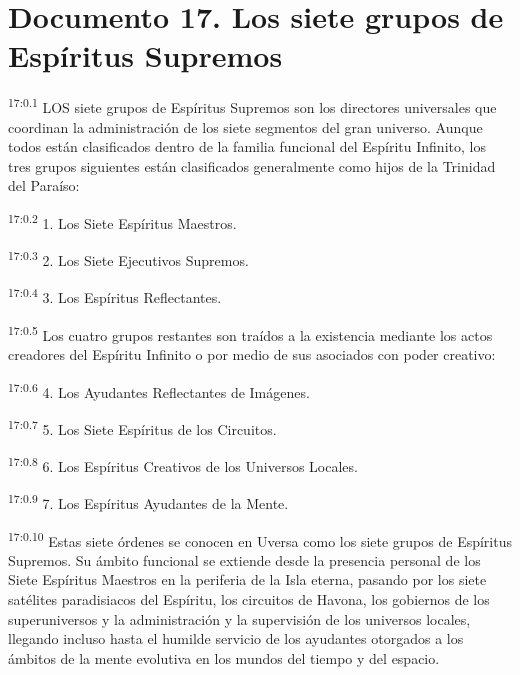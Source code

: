 \chapter{Documento 17. Los siete grupos de Espíritus Supremos}
\par
\textsuperscript{17:0.1} LOS siete grupos de Espíritus Supremos son los directores universales que coordinan la administración de los siete segmentos del gran universo. Aunque todos están clasificados dentro de la familia funcional del Espíritu Infinito, los tres grupos siguientes están clasificados generalmente como hijos de la Trinidad del Paraíso:

\par
\textsuperscript{17:0.2} 1. Los Siete Espíritus Maestros.

\par
\textsuperscript{17:0.3} 2. Los Siete Ejecutivos Supremos.

\par
\textsuperscript{17:0.4} 3. Los Espíritus Reflectantes.

\par
\textsuperscript{17:0.5} Los cuatro grupos restantes son traídos a la existencia mediante los actos creadores del Espíritu Infinito o por medio de sus asociados con poder creativo:

\par
\textsuperscript{17:0.6} 4. Los Ayudantes Reflectantes de Imágenes.

\par
\textsuperscript{17:0.7} 5. Los Siete Espíritus de los Circuitos.

\par
\textsuperscript{17:0.8} 6. Los Espíritus Creativos de los Universos Locales.

\par
\textsuperscript{17:0.9} 7. Los Espíritus Ayudantes de la Mente.

\par
\textsuperscript{17:0.10} Estas siete órdenes se conocen en Uversa como los siete grupos de Espíritus Supremos. Su ámbito funcional se extiende desde la presencia personal de los Siete Espíritus Maestros en la periferia de la Isla eterna, pasando por los siete satélites paradisiacos del Espíritu, los circuitos de Havona, los gobiernos de los superuniversos y la administración y la supervisión de los universos locales, llegando incluso hasta el humilde servicio de los ayudantes otorgados a los ámbitos de la mente evolutiva en los mundos del tiempo y del espacio.

